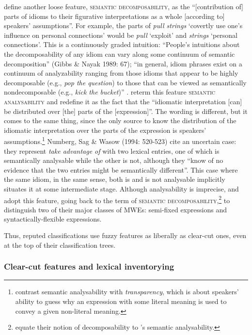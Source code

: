 \documentclass[output=paper]{langsci/langscibook}
\begin{document}
\citet[104]{Gibbs1989} define another loose feature, \textsc{semantic decomposability}, as the “[contribution of] parts of idioms to their figurative interpretations as a whole [according to] speakers’ assumptions”. For example, the parts of \textit{pull strings} ‘covertly use one’s influence on personal connections’ would be \textit{pull} ‘exploit’ and \textit{strings} ‘personal connections’. This is a continuously graded intuition: “People’s intuitions about the decomposability of any idiom can vary along some continuum of semantic decomposition” (Gibbs \& Nayak 1989: 67); “in general, idiom phrases exist on a continuum of analyzability ranging from those idioms that appear to be highly decomposable (e.g., \textit{pop the question}) to those that can be viewed as semantically nondecomposable (e.g., \textit{kick the bucket})” \citep[107]{Gibbs1989}. \cite[497, 508]{Nunberg1994} reterm this feature \textsc{semantic analysability} and redefine it as the fact that the “idiomatic interpretation [can] be distributed over [the] parts of the [expression]”. The wording is different, but it comes to the same thing, since the only source to know the distribution of the idiomatic interpretation over the parts of the expression is speakers’ assumptions.\footnote{ \cite[496–497]{Nunberg1994}  contrast semantic analysability with \textit{transparency}, which is about speakers’ ability to guess why an expression with some literal meaning is used to convey a given non-literal meaning.} Numberg, Sag \& Wasow (1994: 520-523) cite an uncertain case: they represent \textit{take advantage of} with two lexical entries, one of which is semantically analysable while the other is not, although they “know of no evidence that the two entries might be semantically different”. This case where the same idiom, in the same sense, both is and is not analysable implicitly situates it at some intermediate stage. Although analysability is imprecise, \citet{Sag:2002}  and \cite[270]{Baldwin2010} adopt this feature, going back to the term of \textsc{semantic decomposability},\footnote{\cite[270]{Baldwin2010} equate their notion of decomposability to \citet[496]{Nunberg1994}’s  semantic analysability.} to distinguish two of their major classes of MWEs: semi-fixed expressions and syntactically-flexible expressions.

Thus, reputed classifications use fuzzy features as liberally as clear-cut ones, even at the top of their classification trees.

\subsubsection{Clear-cut features and lexical inventorying}
\label{clearcutfeatures}
\end{document}
